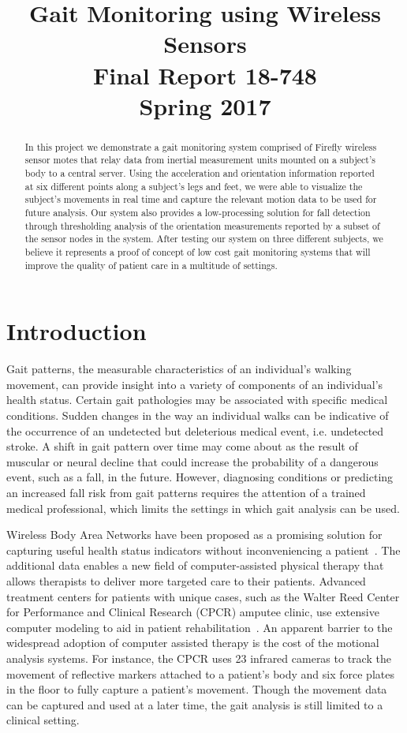 \documentclass[conference]{IEEEtran}
\author{
  \IEEEauthorblockN{
   Iljoo Baek, Mengwen He and Emily Ruppel
  }
 \IEEEauthorblockA{
   Carnegie Mellon University
  }
 \IEEEauthorblockA{
   {ibaek,mengwenhe,eruppel}@andrew.cmu.edu
  }
}
\title{Gait Monitoring using Wireless Sensors\\
        \vspace{4mm}
        \large{Final Report 18-748}\\
        \large{Spring 2017}}
\begin{document}
\maketitle

\begin{abstract}
In this project we demonstrate a gait monitoring system comprised of Firefly wireless
sensor motes that relay data from inertial measurement units mounted on a subject's body
to a central server. Using the acceleration and orientation information reported at six
different points along a subject's legs and feet, we were able to visualize the subject's
movements in real time and capture the relevant motion data to be used for future
analysis. Our system also provides a low-processing solution for fall detection through
thresholding analysis of the orientation measurements reported by a subset of the sensor
nodes in the system. After testing our system on three different subjects, we believe it
represents a proof of concept of low cost gait monitoring systems that will improve the
quality of patient care in a multitude of settings. 
\end{abstract}

\section{Introduction}
  \label{sec:intro}
  Gait patterns, the measurable characteristics of an individual’s walking movement, can
provide insight into a variety of components of an individual’s health status. Certain
gait pathologies may be associated with specific medical conditions. Sudden changes in the
way an individual walks can be indicative of the occurrence of an undetected but
deleterious medical event, i.e. undetected stroke. A shift in gait pattern over time may
come about as the result of muscular or neural decline that could increase the probability
of a dangerous event, such as a fall, in the future. However, diagnosing conditions or
predicting an increased fall risk from gait patterns requires the attention of a trained
medical professional, which limits the settings in which gait analysis can be used.
    
Wireless Body Area Networks have been proposed as a promising solution for capturing
useful health status indicators without inconveniencing a patient~\cite{wban}. The
additional data enables a new field of computer-assisted physical therapy that allows
therapists to deliver more targeted care to their patients. Advanced treatment centers for
patients with unique cases, such as the Walter Reed Center for Performance and Clinical
Research (CPCR) amputee clinic, use extensive computer modeling to aid in patient
rehabilitation~\cite{cpcr}.  An apparent barrier to the widespread adoption of computer
assisted therapy is the cost of the motional analysis systems. For instance, the CPCR uses
23 infrared cameras to track the movement of reflective markers attached to a patient's
body and six force plates in the floor to fully capture a patient's movement. Though the
movement data can be captured and used at a later time, the gait analysis is still limited
to a clinical setting. 
  
\end{document}
